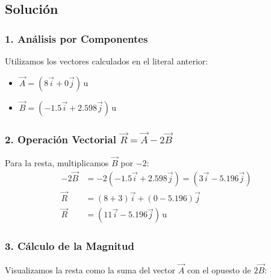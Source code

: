 \documentclass[12pt, a4paper]{article}
\begin{document}
\begin{center}
\end{center}

\subsection*{Solución}

\subsubsection*{1. Análisis por Componentes}
Utilizamos los vectores calculados en el literal anterior:
\begin{itemize}
    \item $\vec{A} = (8\vec{i} + 0\vec{j}) \, \text{u}$
    \item $\vec{B} = (-1.5\vec{i} + 2.598\vec{j}) \, \text{u}$
\end{itemize}

\subsubsection*{2. Operación Vectorial $\vec{R} = \vec{A} - 2\vec{B}$}
Para la resta, multiplicamos $\vec{B}$ por $-2$:
\begin{align*}
    -2\vec{B} &= -2(-1.5\vec{i} + 2.598\vec{j}) = (3\vec{i} - 5.196\vec{j}) \\
    \vec{R} &= (8 + 3)\vec{i} + (0 - 5.196)\vec{j} \\
    \vec{R} &= (11\vec{i} - 5.196\vec{j}) \, \text{u}
\end{align*}

\subsubsection*{3. Cálculo de la Magnitud}
Visualizamos la resta como la suma del vector $\vec{A}$ con el opuesto de $2\vec{B}$:
\end{document}

